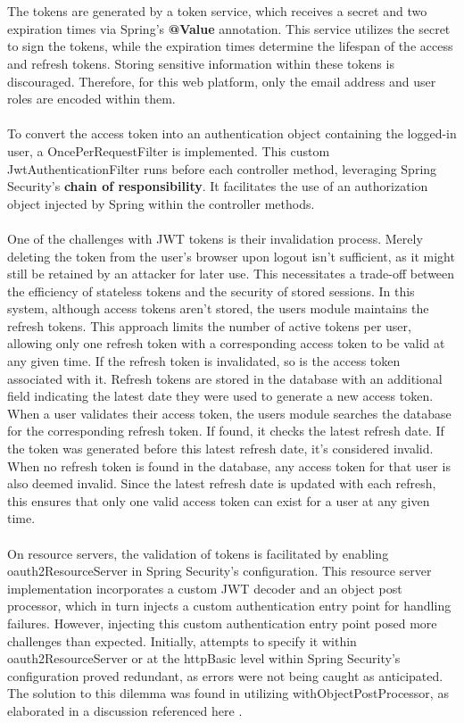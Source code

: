 \\\\
\noindent The tokens are generated by a token service, which receives a secret and two expiration times via Spring's \textbf{@Value} annotation. This service utilizes the secret to sign the tokens, while the expiration times determine the lifespan of the access and refresh tokens. Storing sensitive information within these tokens is discouraged. Therefore, for this web platform, only the email address and user roles are encoded within them.
\\\\
\noindent To convert the access token into an authentication object containing the logged-in user, a OncePerRequestFilter is implemented. This custom JwtAuthenticationFilter runs before each controller method, leveraging Spring Security's \textbf{chain of responsibility}. It facilitates the use of an authorization object injected by Spring within the controller methods.
\\\\
\noindent One of the challenges with JWT tokens is their invalidation process. Merely deleting the token from the user's browser upon logout isn't sufficient, as it might still be retained by an attacker for later use. This necessitates a trade-off between the efficiency of stateless tokens and the security of stored sessions. In this system, although access tokens aren't stored, the users module maintains the refresh tokens. This approach limits the number of active tokens per user, allowing only one refresh token with a corresponding access token to be valid at any given time. If the refresh token is invalidated, so is the access token associated with it. Refresh tokens are stored in the database with an additional field indicating the latest date they were used to generate a new access token. When a user validates their access token, the users module searches the database for the corresponding refresh token. If found, it checks the latest refresh date. If the token was generated before this latest refresh date, it's considered invalid. When no refresh token is found in the database, any access token for that user is also deemed invalid. Since the latest refresh date is updated with each refresh, this ensures that only one valid access token can exist for a user at any given time.
\\\\
\noindent On resource servers, the validation of tokens is facilitated by enabling oauth2ResourceServer in Spring Security's configuration. This resource server implementation incorporates a custom JWT decoder and an object post processor, which in turn injects a custom authentication entry point for handling failures. However, injecting this custom authentication entry point posed more challenges than expected. Initially, attempts to specify it within oauth2ResourceServer or at the httpBasic level within Spring Security's configuration proved redundant, as errors were not being caught as anticipated. The solution to this dilemma was found in utilizing withObjectPostProcessor, as elaborated in a discussion referenced here \cite{springsecurity-github-issue-failhandler}.
